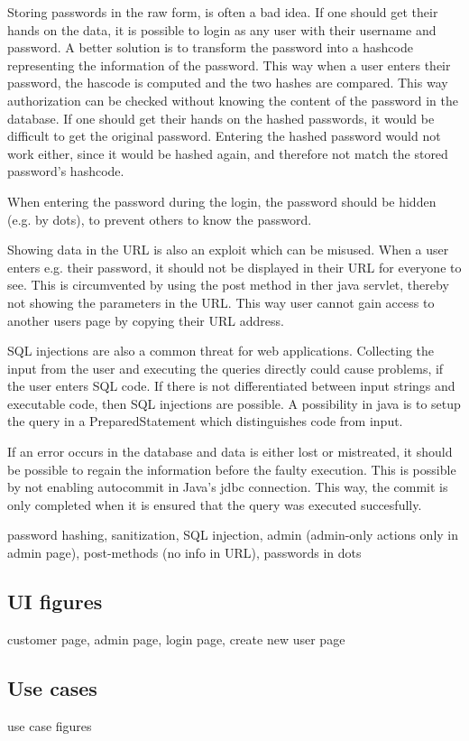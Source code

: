 Storing passwords in the raw form, is often a bad idea. If one should get their hands on the data, it is possible to login as any user with their username and password. A better solution is to transform the password into a hashcode representing the information of the password. This way when a user enters their password, the hascode is computed and the two hashes are compared. This way authorization can be checked without knowing the content of the password in the database. If one should get their hands on the hashed passwords, it would be difficult to get the original password. Entering the hashed password would not work either, since it would be hashed again, and therefore not match the stored password's hashcode.

When entering the password during the login, the password should be hidden (e.g. by dots), to prevent others to know the password.

Showing data in the URL is also an exploit which can be misused. When a user enters e.g. their password, it should not be displayed in their URL for everyone to see. This is circumvented by using the post method in ther java servlet, thereby not showing the parameters in the URL. This way user cannot gain access to another users page by copying their URL address. 

SQL injections are also a common threat for web applications. Collecting the input from the user and executing the queries directly could cause problems, if the user enters SQL code. If there is not differentiated between input strings and executable code, then SQL injections are possible. A possibility in java is to setup the query in a PreparedStatement which distinguishes code from input. 

If an error occurs in the database and data is either lost or mistreated, it should be possible to regain the information before the faulty execution. This is possible by not enabling autocommit in Java's jdbc connection. This way, the commit is only completed when it is ensured that the query was executed succesfully.


password hashing, sanitization, SQL injection, admin (admin-only actions only in admin page), post-methods (no info in URL), passwords in dots



\subsection{UI figures}
customer page, admin page, login page, create new user page

\subsection{Use cases}
use case figures
